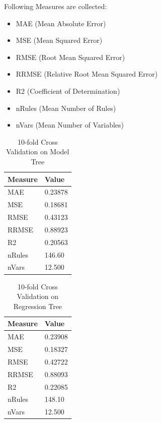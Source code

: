 \documentclass{article}
\begin{document}
\bigskip
Following Measures are collected:
\begin{itemize}
	\item MAE (Mean Absolute Error)
	\item MSE (Mean Squared Error)
	\item RMSE (Root Mean Squared Error)
	\item RRMSE (Relative Root Mean Squared Error)
	\item R2 (Coefficient of Determination)
	\item nRules (Mean Number of Rules)
	\item nVars (Mean Number of Variables)
\end{itemize}

\begin{table}[H]
	\centering
	\caption{10-fold Cross Validation on Model Tree}
	\label{tab:CV-ModelTree}
	\begin{tabular}{|l|l|}
		\hline
		\textbf{Measure} & \textbf{Value} \\ \hline
		MAE       		& 0.23878 \\ \hline
		MSE       		& 0.18681 \\ \hline
		RMSE       		& 0.43123 \\ \hline
		RRMSE       	& 0.88923 \\ \hline
		R2       		& 0.20563 \\ \hline
		nRules       	& 146.60  \\ \hline
		nVars       	& 12.500  \\ \hline
	\end{tabular}
\end{table}

\begin{table}[H]
	\centering
	\caption{10-fold Cross Validation on Regression Tree}
	\label{tab:CV-RegressionTree}
	\begin{tabular}{|l|l|}
		\hline
		\textbf{Measure} 	& \textbf{Value} \\ \hline
		MAE       			& 0.23908 		 \\ \hline
		MSE       			& 0.18327 		 \\ \hline
		RMSE       			& 0.42722		 \\ \hline
		RRMSE       		& 0.88093 	  	 \\ \hline
		R2       			& 0.22085  	 	 \\ \hline
		nRules       		& 148.10   		 \\ \hline
		nVars       		& 12.500   		 \\ \hline
	\end{tabular}
\end{table}
\end{document}
